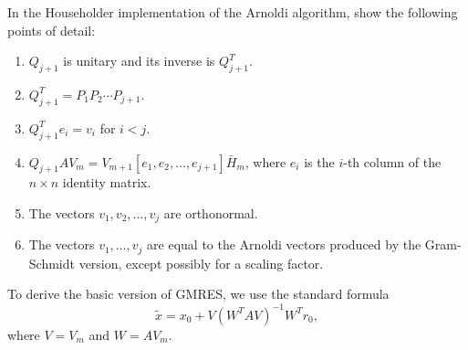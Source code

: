 \documentclass{ctexart}
\newif\ifpreface
\begin{document}
\large
\setlength{\baselineskip}{1.2em}
\ifpreface
    
\newgeometry{left=2cm,right=2cm,top=2cm,bottom=2cm}
\else
{}
\maketitle
\fi
\begin{problem} 
In the Householder implementation of the Arnoldi algorithm, show the following points of detail:
\begin{enumerate}[label=(\alph*)]
    \item $Q_{j+1}$ is unitary and its inverse is $Q_{j+1}^{T}$.
    \item $Q_{j+1}^{T} = P_1 P_2 \cdots P_{j+1}$.
    \item $Q_{j+1}^{T} e_i = v_i$ for $i < j$.
    \item $Q_{j+1} A V_m = V_{m+1} [e_1, e_2, \ldots, e_{j+1}] \bar{H}_m$, where $e_i$ is the $i$-th column of the $n \times n$ identity matrix.
    \item The vectors $v_1, v_2, \ldots, v_j$ are orthonormal.
    \item The vectors $v_1, \ldots, v_j$ are equal to the Arnoldi vectors produced by the Gram-Schmidt version, except possibly for a scaling factor.
\end{enumerate}
\end{problem}
\begin{problem} 
To derive the basic version of GMRES, we use the standard formula
\begin{equation} \label{eq:5.7}
\tilde{x} = x_0 + V \left( W^{T} A V \right)^{-1} W^{T} r_0,
\end{equation}
where \( V = V_m \) and \( W = A V_m \).
\end{problem}
\end{document}
